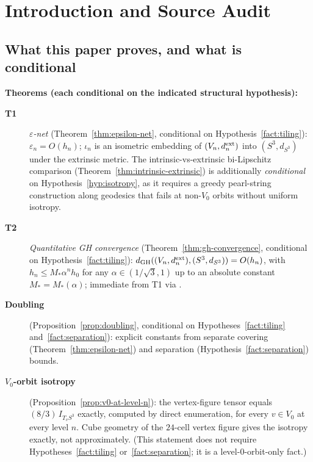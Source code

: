 \documentclass[11pt, a4paper]{amsart}
\theoremstyle{definition}
\newcommand{\dGH}{d_{\mathrm{GH}}}
\newcommand{\dsph}{d_{S^3}}
\begin{document}
\tableofcontents

\section{Introduction and Source Audit}
\label{sec:intro}

\subsection{What this paper proves, and what is conditional}

\textbf{Theorems (each conditional on the indicated structural
hypothesis):}
\begin{description}
\item[\textbf{T1}] \emph{$\varepsilon$-net}
  (Theorem~\ref{thm:epsilon-net}, conditional on
  Hypothesis~\ref{fact:tiling}): $\varepsilon_n = O(h_n)$;
  $\iota_n$ is an isometric embedding of $(V_n, d_n^{\rm ext})$
  into $(S^3, \dsph)$ under the extrinsic metric.
  The intrinsic-vs-extrinsic bi-Lipschitz comparison
  (Theorem~\ref{thm:intrinsic-extrinsic}) is additionally
  \emph{conditional} on Hypothesis~\ref{hyp:isotropy}, as it
  requires a greedy pearl-string construction along geodesics
  that fails at non-$V_0$ orbits without uniform isotropy.
\item[\textbf{T2}] \emph{Quantitative GH convergence}
  (Theorem~\ref{thm:gh-convergence}, conditional on
  Hypothesis~\ref{fact:tiling}): $\dGH((V_n, d_n^{\rm ext}),
  (S^3, \dsph)) = O(h_n)$, with $h_n \leq M_\ast \alpha^n h_0$
  for any $\alpha \in (1/\sqrt{3}, 1)$ up to an absolute
  constant $M_\ast = M_\ast(\alpha)$; immediate from T1 via
  \cite[Prop.~7.3.10]{BuragoBuragoIvanov}.
\item[\textbf{Doubling}] (Proposition~\ref{prop:doubling},
  conditional on Hypotheses~\ref{fact:tiling} and~\ref{fact:separation}):
  explicit constants from separate covering (Theorem~\ref{thm:epsilon-net})
  and separation (Hypothesis~\ref{fact:separation}) bounds.
\item[\textbf{$V_0$-orbit isotropy}] (Proposition~\ref{prop:v0-at-level-n}):
  the vertex-figure tensor equals $(8/3)\,I_{T_v S^3}$ exactly,
  computed by direct enumeration, for every $v \in V_0$ at every
  level $n$. Cube geometry of the $24$-cell vertex figure gives
  the isotropy exactly, not approximately. (This statement does
  not require Hypotheses~\ref{fact:tiling} or~\ref{fact:separation};
  it is a level-$0$-orbit-only fact.)
\end{description}
\end{document}
